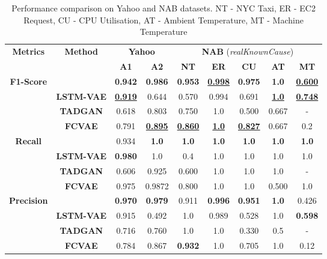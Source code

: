   

\begin{table}[h!]
\centering
\caption{Performance comparison on Yahoo and NAB datasets. 
NT - NYC Taxi, ER - EC2 Request, CU - CPU Utilisation, AT - Ambient Temperature, MT - Machine Temperature}

\renewcommand{\arraystretch}{1.4}
\setlength{\tabcolsep}{9pt}

\begin{tabular}{c c cc ccccc}
\toprule

\multirow{2}{*}{\textbf{Metrics}} & \multirow{2}{*}{\textbf{Method}} 
& \multicolumn{2}{c}{\textbf{Yahoo}} 
& \multicolumn{5}{c}{\textbf{NAB} (\emph{realKnownCause})} \\

\cmidrule(lr){3-4} \cmidrule(lr){5-9}

& & \textbf{A1} & \textbf{A2} 
& \textbf{NT} & \textbf{ER} & \textbf{CU} & \textbf{AT} & \textbf{MT} \\

\midrule

\multirow{4}{*}{\textbf{F1-Score}} 
& \textbf{\fname{}} & \textbf{0.942} & \textbf{0.986} & \textbf{0.953} & \underline{\textbf{0.998}} & \textbf{0.975} & \textbf{1.0} & \underline{\textbf{0.600}} \\
& \textbf{LSTM-VAE} & \underline{\textbf{0.919}} & 0.644 & 0.570 & 0.994 & 0.691 & \underline{\textbf{1.0}} & \underline{\textbf{0.748}} \\ 
& \textbf{TADGAN} & 0.618 & 0.803  & 0.750 & 1.0 & 0.500 & 0.667 & - \\
& \textbf{FCVAE} & 0.791 & \underline{\textbf{0.895}}  & \underline{\textbf{0.860}} & \underline{\textbf{1.0}} & \underline{\textbf{0.827}} & 0.667 & 0.2 \\ 

\midrule

\multirow{4}{*}{\textbf{Recall}} 
& \textbf{\fname{}} & 0.934 & \textbf{1.0} & \textbf{1.0} & \textbf{1.0} & \textbf{1.0} & \textbf{1.0} & \textbf{1.0}  \\
& \textbf{LSTM-VAE} & \textbf{0.980} & 1.0 & 0.4 & 1.0 & 1.0 & 1.0 & 1.0 \\ 
& \textbf{TADGAN} & 0.606 & 0.925 & 0.600 & 1.0 & 1.0 & 1.0 & - \\
& \textbf{FCVAE} & 0.975 & 0.9872 & 0.800 & 1.0 & 1.0 & 0.500 & 1.0 \\

\midrule

\multirow{4}{*}{\textbf{Precision}} 
& \textbf{\fname{}} & \textbf{0.970} & \textbf{0.979} & 0.911 & \textbf{0.996} & \textbf{0.951} & \textbf{1.0} & 0.426 \\
& \textbf{LSTM-VAE} & 0.915 & 0.492 & 1.0 & 0.989 & 0.528 & 1.0 & \textbf{0.598} \\ 
& \textbf{TADGAN} & 0.716 & 0.760 & 1.0 & 1.0 & 0.330 & 0.5 & - \\
& \textbf{FCVAE} & 0.784 & 0.867 & \textbf{0.932} & 1.0 & 0.705 & 1.0 & 0.12 \\

\bottomrule
\end{tabular}

\label{tab:performance}
\end{table}